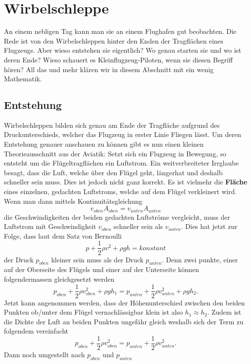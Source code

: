 %
%
%
\section{Wirbelschleppe}
An einem nebligen Tag kann man sie an einem Flughafen gut beobachten. 
Die Rede ist von den Wirbelschleppen hinter den Enden der Tragflächen eines Flugzeugs.
Aber wieso entstehen sie eigentlich? 
Wo genau starten sie und wo ist deren Ende?
Wieso schauert es Kleinflugzeug-Piloten, wenn sie diesen Begriff hören?
All das und mehr klären wir in diesem Abschnitt mit ein wenig Mathematik.

\subsection{Entstehung}
Wirbelschleppen bilden sich genau am Ende der Tragfläche aufgrund des Druckunterschieds, welcher das Flugzeug in erster Linie Fliegen lässt.
Um deren Entstehung genauer anschauen zu können gibt es nun einen kleinen Theorieausschnitt aus der Aviatik:
Setzt sich ein Flugzeug in Bewegung, so entsteht um die Flügeltragflächen ein Luftstrom.
Ein weitverbreiteter Irrglaube besagt, dass die Luft, welche über den Flügel geht, \glqq länger\grqq hat und deshalb schneller sein muss.
Dies ist jedoch nicht ganz korrekt.
Es ist vielmehr die \textbf{Fläche} eines einzelnen, gedachten Luftstroms, welche auf dem Flügel verkleinert wird.%
Wenn man dann mittels Kontinuitätsgleichung
\[v_{oben}A_{oben} = v_{unten}A_{unten}\]
die Geschwindigkeiten der beiden gedachten Luftströme vergleicht, muss der Luftstrom mit Geschwindigkeit $v_{oben}$ schneller sein als $v_{unten}$.
Dies hat jetzt zur Folge, dass laut dem Satz von Bernoulli 
\[p+\frac{1}{2}\rho v^2+\rho gh=konstant\]
der Druck $p_{oben}$ kleiner sein muss als der Druck $p_{unten}$.
Denn zwei punkte, einer auf der Oberseite des Flügels und einer auf der Unterseite können folgendermassen gleichgesetzt werden
\[p_{oben}+\frac{1}{2}\rho v^2_{oben} + \rho gh_1 = p_{unten}+\frac{1}{2}\rho v^2_{unten}+\rho gh_2.\]
Jetzt kann angenommen werden, dass der Höhenunterschied zwischen den beiden Punkten ob/unter dem Flügel vernachlässigbar klein ist also \(h_1\approx h_2\).
Zudem ist die Dichte der Luft an beiden Punkten ungefähr gleich weshalb sich der Term zu folgendem vereinfacht
\[p_{oben}+\frac{1}{2}\rho v^2_{oben} = p_{unten}+\frac{1}{2}\rho v^2_{unten}.\]
Dann noch umgestellt nach $p_{oben}$ und $p_{unten}$
